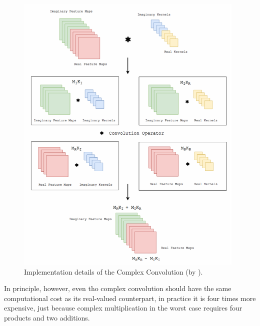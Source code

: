\documentclass[../main.tex]{subfiles}
\begin{document}
\begin{figure}[!ht]
	\centering
	\includegraphics[scale=1.75]{pictures/complex_convolution}
	\caption{Implementation details of the Complex Convolution (by \cite{trabelsi2018deep}).}
	\label{fig:cmplx_convolution}
\end{figure}

In principle, however, even tho complex convolution should have the same computational cost as its real-valued counterpart, in practice it is four times more expensive, just because complex multiplication in the worst case requires four products and two additions.
\end{document}
